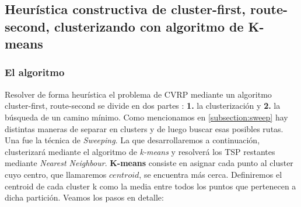 \subsection{Heurística constructiva de cluster-first, route-second, clusterizando con algoritmo de K-means}
\subsubsection{El algoritmo}\label{kmeans-el-algoritmo}
Resolver de forma heurística el problema de CVRP mediante un algoritmo cluster-first, route-second se divide en dos partes : \textbf{1.} la clusterización y \textbf{2.} la búsqueda de un camino mínimo. Como mencionamos en \ref{subsection:sweep} hay distintas maneras de separar en clusters y de luego buscar esas posibles rutas. Una fue la técnica de \textit{Sweeping}. La que desarrollaremos a continuación, clusterizará mediante el algoritmo de \textit{k-means} y resolverá los TSP restantes mediante \textit{Nearest Neighbour}.
\textbf{K-means} consiste en asignar cada punto al cluster cuyo centro, que llamaremos $centroid$, se encuentra más cerca. Definiremos el centroid de cada cluster k como la media entre todos los puntos que pertenecen a dicha partición. Veamos los pasos en detalle:

